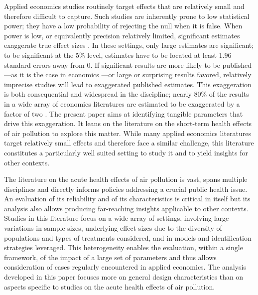 \documentclass[12pt]{article}
\begin{document}
    
     Applied economics studies routinely target effects that are relatively small and therefore difficult to capture. Such studies are inherently prone to low statistical power; they have a low probability of rejecting the null when it is false. When power is low, or equivalently precision relatively limited, significant estimates exaggerate true effect sizes \citep{gelmanType2000, ioannidis_why_2008, gelman_beyond_2014}. In these settings, only large estimates are significant; to be significant at the 5\% level, estimates have to be located  at least 1.96 standard errors away from 0. If significant results are more likely to be published---as it is the case in economics  \citep{andrews_identification_2019,abadie_statistical_2020, brodeur_methods_2020}---or large or surprising results favored, relatively imprecise studies will lead to exaggerated published estimates. This exaggeration is both consequential and widespread in the discipline; nearly 80\% of the results in a wide array of economics literatures are estimated to be exaggerated by a factor of two \citep{ioannidis_power_2017}. The present paper aims at identifying tangible parameters that drive this exaggeration. It leans on the literature on the short-term health effects of air pollution to explore this matter. While many applied economics literatures target relatively small effects and therefore face a similar challenge, this literature constitutes a particularly well suited setting to study it and to yield insights for other contexts. 

    The literature on the acute health effects of air pollution is vast, spans multiple disciplines and directly informs policies addressing a crucial public health issue. An evaluation of its reliability and of its characteristics is critical in itself but its analysis also allows producing far-reaching insights applicable to other contexts. Studies in this literature focus on a wide array of settings, involving large variations in sample sizes, underlying effect sizes due to the diversity of populations and types of treatments considered, and in models and identification strategies leveraged. This heterogeneity enables the evaluation, within a single framework, of the impact of a large set of parameters and thus allows consideration of cases regularly encountered in applied economics. The analysis developed in this paper focuses more on general design characteristics than on aspects specific to studies on the acute health effects of air pollution. %
\end{document}
